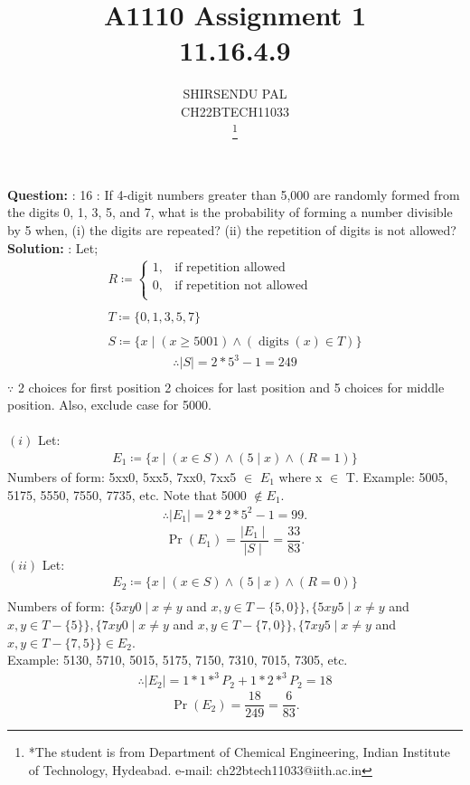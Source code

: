 \documentclass[journal,12pt,two column]{IEEEtran}
\title{A1110 Assignment 1 \\ 11.16.4.9}
\author{SHIRSENDU PAL \\ CH22BTECH11033 \\
        \thanks{*The student is from Department of Chemical Engineering, Indian Institute of Technology, Hydeabad. e-mail: ch22btech11033@iith.ac.in}}
\providecommand{\pr}[1]{\ensuremath{\Pr\left(#1\right)}}
\newcommand{\question}{\noindent \textbf{Question: }}
\newcommand{\solution}{\noindent \textbf{Solution: }}
\begin{document}
\maketitle
\question: 16 : If 4-digit numbers greater than 5,000 are randomly formed from the digits 0, 1, 3, 5, and 7, what is the probability of forming a number divisible by 5 when, (i) the digits are repeated? (ii) the repetition of digits is not allowed?\\
\solution : Let;
 \begin{align*} 
    R \coloneqq 
        \begin{cases}
            1, & \text{if repetition allowed}\\
            0, & \text{if repetition not allowed}\\
        \end{cases}
    \\ \\
    T \coloneqq \{0, 1, 3, 5, 7\}\\ \\
    S \coloneqq \{x \mid (x \geq 5001) \land (\operatorname{digits}(x) \in T)\}
 \end{align*}
 \begin{align*}
 	\therefore \mid S \mid = 2*5^3 -1 = 249 \\  
 \end{align*}
 $\because$ 2 choices for first position 2 choices for last position and 5 choices for middle position. Also, exclude case for 5000.\\ \\
 $(i)$ Let:
  \begin{align*}
  	E_1 \coloneqq \{x \mid (x \in S)\land(5 \mid x)\land(R = 1)\}
   \end{align*}
    Numbers of form: 5xx0, 5xx5, 7xx0, 7xx5 $\in$ $E_1$ where x $\in$ T. Example: 5005, 5175, 5550, 7550, 7735, etc. Note that 5000 $\notin E_1$. 
   \begin{align*}
        \therefore \mid E_1\mid = 2 * 2 * 5^2 -1 = 99.
  \end{align*}
  \begin{equation*}
    \pr{E_1} = \frac{\mid E_1 \mid}{\mid S \mid} = \frac{33}{83}.
  \end{equation*}
$(ii)$ Let:
    \begin{align*}
        E_2 \coloneqq \{x \mid (x \in S)\land(5 \mid x)\land (R=0)\}\\
    \end{align*}
    Numbers of form: $\{5xy0 \mid x \neq y$ and $ x, y \in T - \{5, 0\}\}, \{5xy5 \mid x \neq y$ and $x, y \in T-\{5\}\}, \{7xy0 \mid x \neq y$ and $x, y \in T - \{7, 0\}\}, \{7xy5 \mid x \neq y $ and $x, y \in T - \{7, 5\}\} \in E_2$.\\
    Example: 5130, 5710, 5015, 5175, 7150, 7310, 7015, 7305, etc.  
    \begin{align*}
        \therefore \mid E_2 \mid = 1*1*^3P_2 + 1*2*^3P_2 = 18
    \end{align*}
    \begin{equation*}
        \pr{E_2} = \frac{18}{249} = \frac{6}{83}.
    \end{equation*}
\end{document}
